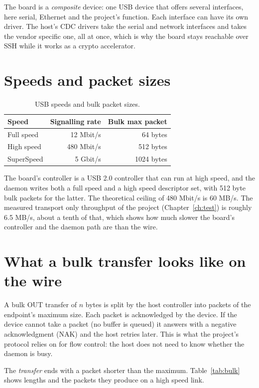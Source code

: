 The board is a \emph{composite} device: one USB device that offers several interfaces, here serial, Ethernet and the project's function. Each interface can have its own driver. The host's CDC drivers take the serial and network interfaces and  takes the vendor specific one, all at once, which is why the board stays reachable over SSH while it works as a crypto accelerator.

\section{Speeds and packet sizes}

\begin{table}[ht]
\centering
\begin{tabular}{lrr}
\toprule
Speed & Signalling rate & Bulk max packet \\
\midrule
Full speed & 12 Mbit/s & 64 bytes \\
High speed & 480 Mbit/s & 512 bytes \\
SuperSpeed & 5 Gbit/s & 1024 bytes \\
\bottomrule
\end{tabular}
\caption{USB speeds and bulk packet sizes.}
\end{table}

The board's controller is a USB 2.0 controller that can run at high speed, and the daemon writes both a full speed and a high speed descriptor set, with 512 byte bulk packets for the latter. The theoretical ceiling of 480 Mbit/s is 60 MB/s. The measured transport only throughput of the project (Chapter~\ref{ch:test}) is roughly 6.5 MB/s, about a tenth of that, which shows how much slower the board's controller and the daemon path are than the wire.

\section{What a bulk transfer looks like on the wire}

A bulk OUT transfer of $n$ bytes is split by the host controller into packets of the endpoint's maximum size. Each packet is acknowledged by the device. If the device cannot take a packet (no buffer is queued) it answers with a negative acknowledgment (NAK) and the host retries later. This is what the project's protocol relies on for flow control: the host does not need to know whether the daemon is busy.

The \emph{transfer} ends with a packet shorter than the maximum. Table~\ref{tab:bulk} shows lengths and the packets they produce on a high speed link.

